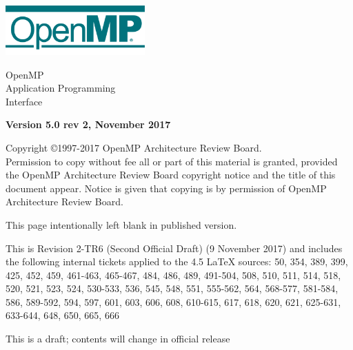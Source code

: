 
  \begin{titlepage}
    \begin{flushleft}
     \hspace{-6em} \includegraphics[width=0.4\textwidth]{openmp-logo.png}
    \end{flushleft}

    \begin{adjustwidth}{-0.75in}{0in}
    \begin{center}
      \Huge
      \textsf{OpenMP\\Application Programming\\Interface}

      \vspace{0.5in}\textsf{    }\vspace{-0.7in}
      \normalsize

      \vspace{1.0in}

      \textbf{Version 5.0 rev 2, November 2017}
    \end{center}
    \end{adjustwidth}

    \vspace{3.0in}

\begin{adjustwidth}{0pt}{1em}\setlength{\parskip}{0.25\baselineskip}%
Copyright \copyright 1997-2017 OpenMP Architecture Review Board.\\
Permission to copy without fee all or part of this material is granted,
provided the OpenMP Architecture Review Board copyright notice and
the title of this document appear. Notice is given that copying is by
permission of OpenMP Architecture Review Board.\end{adjustwidth}

  \end{titlepage}


\clearpage
\thispagestyle{empty}
\phantom{a}
This page intentionally left blank in published version.

This is Revision 2-TR6 (Second Official Draft) (9 November 2017) and
includes the following internal tickets applied to the 4.5 LaTeX sources:
50, 354, 389, 399, 425, 452, 459, 461-463, 465-467, 484, 486, 489, 491-504,
508, 510, 511, 514, 518, 520, 521, 523, 524, 530-533, 536, 545, 548,
551, 555-562, 564, 568-577, 581-584, 586, 589-592, 594, 597, 601, 603, 606,
608, 610-615, 617, 618, 620, 621, 625-631, 633-644, 648, 650, 665, 666

This is a draft; contents will change in official release

\vfill

